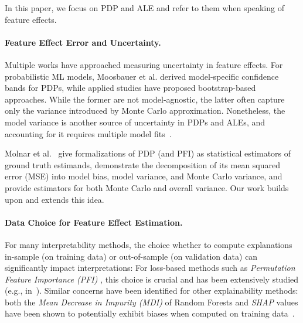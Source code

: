\documentclass[runningheads]{llncs}
\begin{document}
In this paper, we focus on PDP and ALE and refer to them when speaking of
feature effects.

\paragraph{Feature Effect Error and Uncertainty.}
Multiple works have approached measuring uncertainty in feature effects. For
probabilistic ML models, Moosbauer et al.\cite{moosbauer_explaining_2021}
derived model-specific confidence bands for PDPs, while applied studies have
proposed bootstrap-based
approaches\cite{esselman_landscape_2015,grange_using_2019}. While the former
are not model-agnostic, the latter often capture only the variance introduced
by Monte Carlo approximation. Nonetheless, the model variance is another source
of uncertainty in PDPs and ALEs, and accounting for it requires multiple model
fits~\cite{apley_visualizing_2020,molnar_general_2022}.

Molnar et al.~\cite{molnar_relating_2023} give formalizations of PDP (and PFI)
as statistical estimators of ground truth estimands, demonstrate the
decomposition of its mean squared error (MSE) into model bias, model variance,
and Monte Carlo variance, and provide estimators for both Monte Carlo and
overall variance. Our work builds upon and extends this idea.

\paragraph{Data Choice for Feature Effect Estimation.}
For many interpretability methods, the choice whether to compute explanations
in-sample (on training data) or out-of-sample (on validation data) can
significantly impact interpretations: For loss-based methods such as
\textit{Permutation Feature Importance (PFI)
}\cite{breiman_random_2001,fisher_all_2019}, this choice is crucial and has
been extensively studied (e.g., in~\cite{molnar_general_2022}). Similar
concerns have been identified for other explainability methods: both the
\textit{Mean Decrease in Impurity (MDI)} of Random Forests and \textit{SHAP}
values have been shown to potentially exhibit biases when computed on training
data~\cite{loecher_debiasing_2022,loecher_debiasing_2024}.
\end{document}
